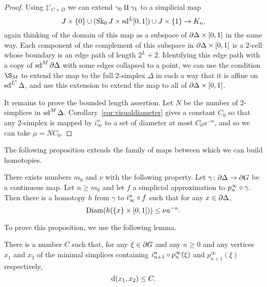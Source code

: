 \documentclass[a4paper]{article}
\begin{document}
\begin{proof}
  Using $\ddag'_{C+D}$ we can extend $\gamma_0\amalg\gamma_1$ to a
  simplicial map
  \begin{equation*}
    J\times\{0\} \cup(\operatorname{Sk}_0 J \times \operatorname{sd}^L [0,1]) \cup J\times\{1\} \to K_n,
  \end{equation*}
  again thinking of the domain of this map as a subspace of
  $\partial\Delta\times[0,1]$ in the same way. Each component of the
  complement of this subspace in $\partial\Delta\times[0,1]$ is a $2$-cell
  whose boundary is an edge path of length $2^L+2$. Identifying this edge path
  with a copy of $\operatorname{sd}^M\partial\Delta$ with some edges collapsed to a point,
  we can use the condition $\S_M$ to extend the map to the full $2$-simplex
  $\Delta$ in such a way that it is affine on $\operatorname{sd}^{L'}\Delta$, and use this
  extension to extend the map to all of $\partial\Delta\times[0,1]$.
  
  It remains to prove the bounded length assertion.  Let $N$ be the number of
  $2$-simplices in $\operatorname{sd}^M\Delta$.  Corollary~\ref{cor:visualdiameter} gives a
  constant $C_0$ so that any $2$-simplex is mapped by $i^n_\infty$ to a set of
  diameter at most $C_0 a^{-n}$, and so we can take $\mu = NC_0$.
\end{proof}

The following proposition extends the family of maps between which we can build
homotopies.

\begin{proposition}\label{prop:uniform_homotopies}
  There exists numbers $m_0$ and $\nu$ with the following property. Let
  $\gamma\colon\partial\Delta\to\partial G$ be a continuous map. Let $n \geq
  m_0$ and let $f$ a simplicial approximation to $p^\infty_n\circ\gamma$.
  Then there is a homotopy $h$ from $\gamma$ to $i^n_\infty\circ f$ such
  that for any $x \in \partial\Delta$,
  \begin{equation*}
    \operatorname{Diam}(h(\{x\}\times [0,1])) \leq \nu a^{-n}.
  \end{equation*}
\end{proposition}

To prove this proposition, we use the following lemma.

\begin{lemma}\label{lem:name_this}
  There is a number $C$ such that, for any $\xi \in \partial G$ and any $n
  \geq 0$ and any vertices $x_1$ and $x_2$ of the minimal simplices containing
  $i^n_{n+1}\circ p^\infty_n(\xi)$ and $p^\infty_{n+1}(\xi)$ respectively,
  \begin{equation*}
    \operatorname{d}(x_1, x_2) \leq C.
  \end{equation*}
\end{lemma}
\end{document}
